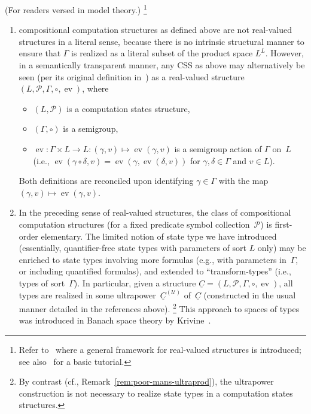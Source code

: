 \begin{remark}(For readers versed in model theory.)%
    \footnote{Refer to~\cite{Keisler:2023} where a general framework for real-valued structures is introduced; see also~\cite[section 6]{Duenez-Iovino:2017} for a basic tutorial.}
    \begin{enumerate}
    \item compositional computation structures as defined above are not real-valued structures in a literal sense, because there is no intrinsic structural manner to ensure that $\Gamma$ is realized as a literal subset of the product space $L^L$.
    However, in a semantically transparent manner, any CSS as above may alternatively be seen (per its original definition in~\cite{alva2024approximability}) as a real-valued structure $(L,\mathcal{P},\Gamma,\circ,\operatorname{ev})$, where
    
    \begin{itemize}
        \item $(L,\mathcal{P})$ is a computation states structure,
        \item $(\Gamma,\circ)$ is a semigroup,
        \item $\operatorname{ev}\colon \Gamma\times L\to L: (\gamma,v)\mapsto \operatorname{ev}(\gamma,v)$ is a semigroup action of $\Gamma$ on~$L$ (i.e., $\operatorname{ev}(\gamma\circ\delta,v) = \operatorname{ev}(\gamma,\operatorname{ev}(\delta,v))$ for $\gamma,\delta\in\Gamma$ and $v\in L$).
    \end{itemize}
    Both definitions are reconciled upon identifying $\gamma\in \Gamma$ with the map $(\gamma,v)\mapsto \operatorname{ev}(\gamma,v)$.

    \item In the preceding sense of real-valued structures, the class of compositional computation structures (for a fixed predicate symbol collection~$\mathcal{P}$) is first-order elementary.
    The limited notion of state type we have introduced (essentially, quantifier-free state types with parameters of sort $L$ only) may be enriched to state types involving more formulas (e.g., with parameters in~$\Gamma$, or including quantified formulas), and extended to “transform-types” (i.e., types of sort~$\Gamma$).
    In particular, given a structure $\underline{C}=(L,\mathcal{P}, \Gamma, \circ, \operatorname{ev})$, all types are realized in some ultrapower~$\underline{C}^{(\mathcal{U})}$ of~$\underline{C}$ (constructed in the usual manner detailed in the references above).
    \footnote{By contrast (cf., Remark~\ref{rem:poor-mans-ultraprod}), the ultrapower construction is not necessary to realize state types in a computation states structures.}
    This approach to spaces of types was introduced in Banach space theory by Krivine~\cite{Krivine:1974, Krivine-Maurey:1981,Krivine:1972}.
\end{enumerate}
\end{remark}

